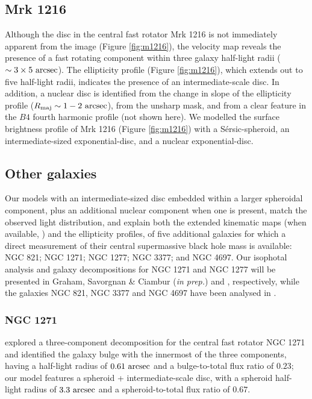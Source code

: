 \documentclass[useAMS,usenatbib,article]{mnras}
\begin{document}
\subsection{Mrk 1216}
Although the disc in the central fast rotator Mrk 1216 is not immediately apparent from the image (Figure \ref{fig:m1216}), 
the velocity map \citep{yildirim2015} reveals the presence of a fast rotating component 
within three galaxy half-light radii ($\sim 3 \times 5~\rm arcsec$). 
The ellipticity profile (Figure \ref{fig:m1216}), 
which extends out to five half-light radii, indicates the presence of an intermediate-scale disc. 
In addition, a nuclear disc is identified from the change in slope of the ellipticity profile ($R_{\rm maj} \sim 1 - 2 \rm~arcsec$), 
from the unsharp mask, 
and from a clear feature in the $B4$ fourth harmonic profile (not shown here). 
We modelled the surface brightness profile of Mrk 1216 (Figure \ref{fig:m1216}) with a S\'ersic-spheroid, 
an intermediate-sized exponential-disc, and a nuclear exponential-disc. 

\subsection{Other galaxies}
Our models with an intermediate-sized disc embedded within a larger spheroidal component, 
plus an additional nuclear component when one is present, 
match the observed light distribution, and explain both the extended kinematic maps (when available, \citealt{arnold2014}) and the ellipticity profiles, 
of five additional galaxies for which a direct measurement of their central supermassive black hole mass is available: 
NGC 821; NGC 1271; NGC 1277; NGC 3377; and NGC 4697. 
Our isophotal analysis and galaxy decompositions for NGC 1271 and NGC 1277 will be presented in 
Graham, Savorgnan \& Ciambur (\emph{in prep.}) and \cite{graham2015n1277}, respectively, 
while the galaxies NGC 821, NGC 3377 and NGC 4697 have been analysed in \cite{paperI}. 

\subsubsection{NGC 1271}
\cite{walsh2015} explored a three-component decomposition for the central fast rotator NGC 1271 
and identified the galaxy bulge with the innermost of the three components, 
having a half-light radius of $0.61~\rm arcsec$ and a bulge-to-total flux ratio of $0.23$; 
our model features a spheroid + intermediate-scale disc, 
with a spheroid half-light radius of $3.3~\rm arcsec$ and a spheroid-to-total flux ratio of $0.67$. 
\end{document}
